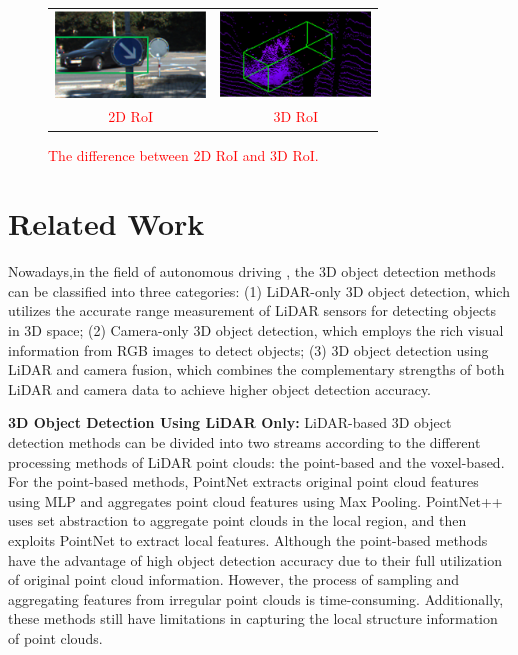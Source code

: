 \begin{sloppypar}
\begin{figure}
        \center
        \begin{tabular}{cc}
                \includegraphics[width=4cm]{new_images1/2D RoI.png} &    \includegraphics[width=4cm]{new_images1/3D RoI.png}         \\
                \textcolor{red}{2D RoI} & \textcolor{red}{3D RoI} \\
                
        \end{tabular}
        \caption{\textcolor{red}{The difference between 2D RoI and 3D RoI.}}
        \label{figure3}
        \vspace{-0.5em}
\end{figure}

\section{Related Work}
\label{sec:1}
Nowadays,in the field of autonomous driving , the 3D object detection methods can be classified into three categories: (1) LiDAR-only 3D object detection, which utilizes the accurate range measurement of LiDAR sensors for detecting objects in 3D space; (2) Camera-only 3D object detection, which employs the rich visual information from RGB images to detect objects; (3) 3D object detection using LiDAR and camera fusion, which combines the complementary strengths of both LiDAR and camera data to achieve higher object detection accuracy.

{\bfseries 3D Object Detection Using LiDAR Only:} LiDAR-based 3D object detection methods can be divided into two streams according to the different processing methods of LiDAR point clouds: the point-based and the voxel-based. For the point-based methods, PointNet\cite{17} extracts original point cloud features using MLP and aggregates point cloud features using Max Pooling. PointNet++\cite{18} uses set abstraction to aggregate point clouds in the local region, and then exploits PointNet to extract local features. Although the point-based methods have the advantage of high object detection accuracy due to their full utilization of original point cloud information. However, the process of sampling and aggregating features from irregular point clouds is time-consuming. Additionally, these methods still have limitations in capturing the local structure information of point clouds.



\end{sloppypar}
